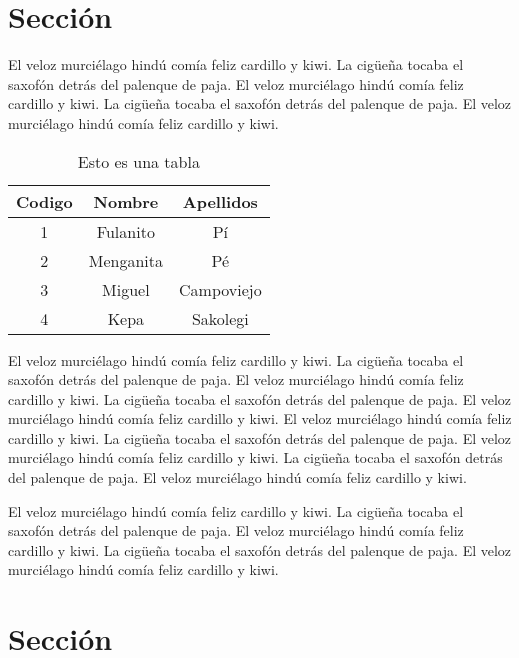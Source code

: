 
\section{Sección} 

El veloz murciélago hindú comía feliz cardillo y kiwi.  La cigüeña tocaba el saxofón detrás del palenque de paja.  El veloz murciélago hindú comía feliz cardillo y kiwi.  La cigüeña tocaba el saxofón detrás del palenque de paja.  El veloz murciélago hindú comía feliz cardillo y kiwi.


\begin{table}
\begin{center}
\begin{tabular}{|c|c|c|}
\hline Codigo & Nombre & Apellidos \\ 
\hline\hline 1 & Fulanito & Pí \\ 
\hline 2 & Menganita & Pé \\ 
\hline 3 & Miguel & Campoviejo \\ 
\hline 4 & Kepa & Sakolegi \\ 
\hline 
\end{tabular} 
\caption{Esto es una tabla}
\label{tbTabla1}
\end{center}
\end{table}

El veloz murciélago hindú comía feliz cardillo y kiwi.  La cigüeña tocaba el saxofón detrás del palenque de paja.  El veloz murciélago hindú comía feliz cardillo y kiwi.  La cigüeña tocaba el saxofón detrás del palenque de paja.  El veloz murciélago hindú comía feliz cardillo y kiwi. El veloz murciélago hindú comía feliz cardillo y kiwi.  La cigüeña tocaba el saxofón detrás del palenque de paja.  El veloz murciélago hindú comía feliz cardillo y kiwi.  La cigüeña tocaba el saxofón detrás del palenque de paja.  El veloz murciélago hindú comía feliz cardillo y kiwi.

El veloz murciélago hindú comía feliz cardillo y kiwi.  La cigüeña tocaba el saxofón detrás del palenque de paja.  El veloz murciélago hindú comía feliz cardillo y kiwi.  La cigüeña tocaba el saxofón detrás del palenque de paja.  El veloz murciélago hindú comía feliz cardillo y kiwi.


\section{Sección} 

